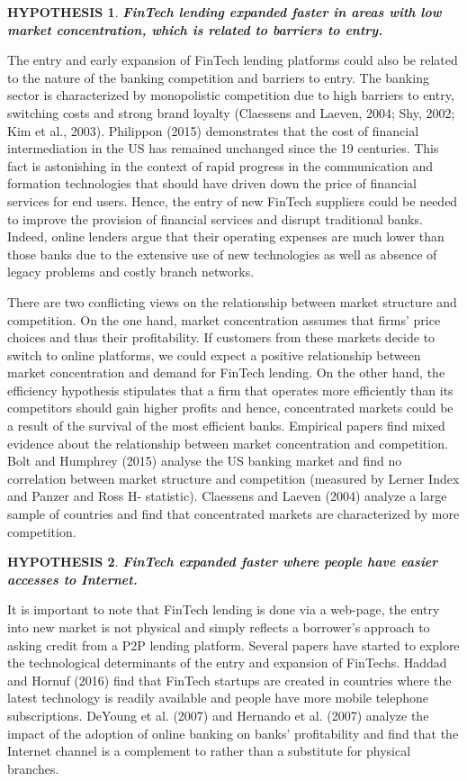 \documentclass[11pt, a4paper, leqno]{article}
\newtheorem{hypothesis}{HYPOTHESIS}
\begin{document}
\begin{hypothesis}
\textbf{FinTech lending expanded faster in areas with low market concentration, which is related to barriers to entry.}
\end{hypothesis}
The entry and early expansion of FinTech lending platforms could also be related to the nature of the banking competition and barriers to entry. The banking sector is characterized by monopolistic competition due to high barriers to entry, switching costs and strong brand loyalty (Claessens and Laeven, 2004; Shy, 2002; Kim et al., 2003). Philippon (2015) demonstrates that the cost of financial intermediation in the US has remained unchanged since the 19 centuries. This fact is astonishing in the context of rapid progress in the communication and formation technologies that should have driven down the price of financial services for end users. Hence, the entry of new FinTech suppliers could be needed to improve the provision of financial services and disrupt traditional banks. Indeed, online lenders argue that their operating expenses are much lower than those banks due to the extensive use of new technologies as well as absence of legacy problems and costly branch networks.

There are two conflicting views on the relationship between market structure and competition. On the one hand, market concentration assumes that firms' price choices and thus their profitability. If customers from these markets decide to switch to online platforms, we could expect a positive relationship between market concentration and demand for FinTech lending. On the other hand, the efficiency hypothesis stipulates that a firm that operates more efficiently than its competitors should gain higher profits and hence, concentrated markets could be a result of the survival of the most efficient banks. Empirical papers find mixed evidence about the relationship between market concentration and competition. Bolt and Humphrey (2015) analyse the US banking market and find no correlation between market structure and competition (measured by Lerner Index and Panzer and Ross H- statistic). Claessens and Laeven (2004) analyze a large sample of countries and find that concentrated markets are characterized by more competition.

\begin{hypothesis}
\textbf{FinTech expanded faster where people have easier accesses to Internet.}
\end{hypothesis}
It is important to note that FinTech lending is done via a web-page, the entry into new market is not physical and simply reflects a borrower's approach to asking credit from a P2P lending platform.  Several papers have started to explore the technological determinants of the entry and expansion of FinTechs. Haddad and Hornuf (2016) find that FinTech startups are created in countries where the latest technology is readily available and people have more mobile telephone subscriptions. DeYoung et al. (2007) and Hernando et al. (2007) analyze the impact of the adoption of online banking on banks’ profitability and find that the Internet channel is a complement to rather than a substitute for physical branches. 
\end{document}
